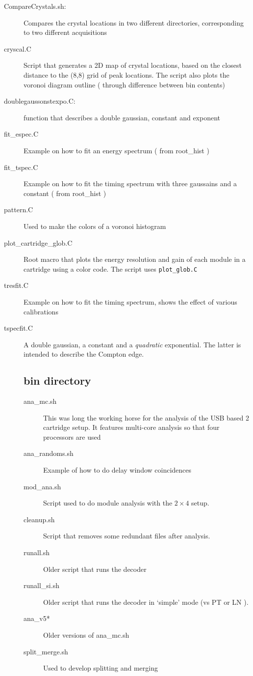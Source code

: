 \documentclass[12pt]{article}
\begin{document}
\begin{description}
\item[CompareCrystals.sh:] Compares the crystal locations in two different directories, corresponding to two different acquisitions
\item[cryscal.C] Script that generates a 2D map of crystal locations, based on the closest distance to the (8,8) grid of peak locations. The script also plots the voronoi diagram outline ( through difference between bin contents)
\item[doublegaussonstexpo.C:] function that describes a double gaussian, constant and exponent 
\item[fit\_espec.C] Example on how to fit an energy spectrum ( from root\_hist )
\item[fit\_tspec.C] Example on how to fit the timing spectrum with three gaussains and a constant ( from root\_hist )
\item[pattern.C] Used to make the colors of a voronoi histogram
\item[plot\_cartridge\_glob.C] Root macro that plots the energy resolution and gain of each module in a cartridge using a color code. The script uses {\tt plot\_glob.C}
\item[tresfit.C] Example on how to fit the timing spectrum, shows the effect of various calibrations
\item[tspecfit.C] A double gaussian, a constant and a {\it quadratic} exponential. The latter is intended to describe the Compton edge. 

\subsection{bin directory}
\begin{description}
\item[ana\_mc.sh] This was long the working horse for the analysis of the USB based 2 cartridge setup. It features multi-core analysis so that four processors are used
\item[ana\_randoms.sh] Example of how to do delay window coincidences
\item[mod\_ana.sh] Script used to do module analysis with the $2\times 4$ setup.
\item[cleanup.sh] Script that removes some redundant files after analysis.
\item[runall.sh] Older script that runs the decoder
\item[runall\_si.sh] Older script that runs the decoder in `simple' mode (vs PT or LN ).
\item[ana\_v5*] Older versions of ana\_mc.sh
\item[split\_merge.sh] Used to develop splitting and merging

\end{description}

\end{description}
\end{document}
